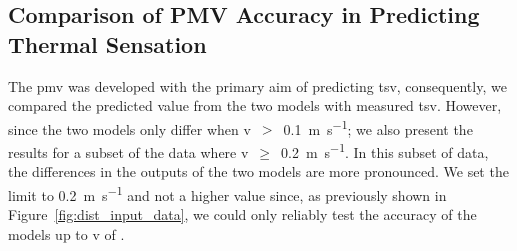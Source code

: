 \subsection{Comparison of PMV Accuracy in Predicting Thermal Sensation}\label{subsec:model-accuracy-comparison-in-predicting-thermal-sensation}
The \ac{pmv} was developed with the primary aim of predicting \ac{tsv}, consequently, we compared the predicted value from the two models with measured \ac{tsv}.
However, since the two models only differ when \ac{v}~$>$~\qty{0.1}{\m\per\s};
we also present the results for a subset of the data where \ac{v}~$\geq$~\qty{0.2}{\m\per\s}.
In this subset of data, the differences in the outputs of the two models are more pronounced.
We set the limit to \qty{0.2}{\m\per\s} and not a higher value since, as previously shown in Figure~\ref{fig:dist_input_data}, we could only reliably test the accuracy of the models up to \ac{v} of .

